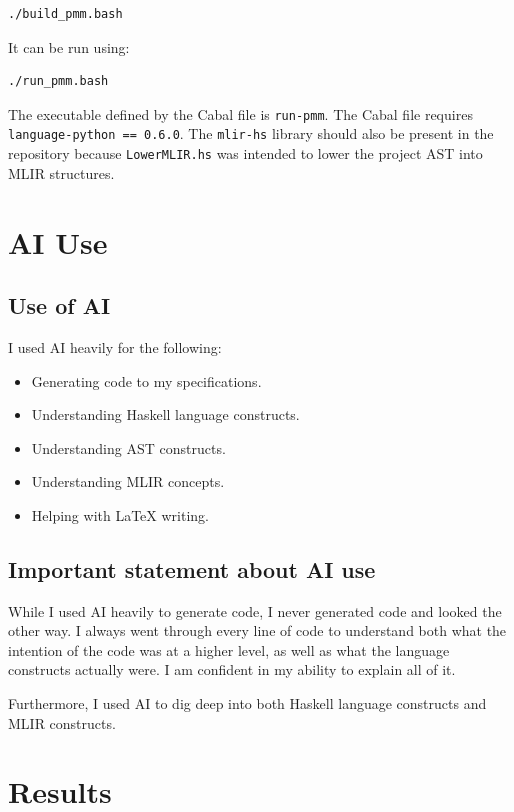 \documentclass[11pt]{article}
\begin{document}
\begin{verbatim}
./build_pmm.bash
\end{verbatim}

It can be run using:

\begin{verbatim}
./run_pmm.bash
\end{verbatim}

The executable defined by the Cabal file is \texttt{run-pmm}. The Cabal file
requires \texttt{language-python == 0.6.0}. The \texttt{mlir-hs} library should
also be present in the repository because \texttt{LowerMLIR.hs} was intended to
lower the project AST into MLIR structures.

\section{AI Use}
\subsection{Use of AI}
I used AI heavily for the following:

\begin{itemize}
	\item Generating code to my specifications.
	\item Understanding Haskell language constructs.
	\item Understanding AST constructs.
	\item Understanding MLIR concepts.
	\item Helping with LaTeX writing.
\end{itemize}

\subsection{Important statement about AI use}

While I used AI heavily to generate code, I never generated code and looked the
other way. I always went through every line of code to understand both what the
intention of the code was at a higher level, as well as what the language
constructs actually were. I am confident in my ability to explain all of it.

Furthermore, I used AI to dig deep into both Haskell language constructs and
MLIR constructs.

\section{Results}
\end{document}
